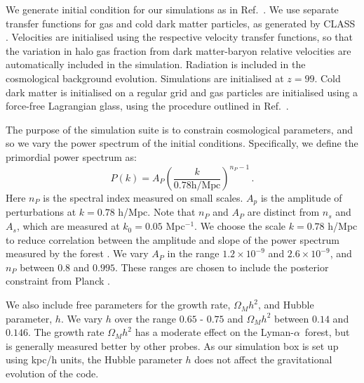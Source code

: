 \documentclass[a4paper,11pt]{article}
\newcommand{\Lya}{Lyman-$\alpha$}
\begin{document}
We generate initial condition for our simulations as in Ref.~\cite{Bird:2020}. We use separate transfer functions for gas and cold dark matter particles, as generated by CLASS \cite{CLASS}. Velocities are initialised using the respective velocity transfer functions, so that the variation in halo gas fraction from dark matter-baryon relative velocities are automatically included in the simulation. Radiation is included in the cosmological background evolution. Simulations are initialised at $z=99$. Cold dark matter is initialised on a regular grid and gas particles are initialised using a force-free Lagrangian glass, using the procedure outlined in Ref.~\cite{Bird:2020}.

The purpose of the simulation suite is to constrain cosmological parameters, and so we vary the power spectrum of the initial conditions. Specifically, we define the primordial power spectrum as:
\begin{equation}
 P(k) = A_P \left(\frac{k}{ 0.78 \mathrm{h/Mpc}}\right)^{n_P-1}\,.
 \label{eq:pk}
\end{equation}
Here $n_P$ is the spectral index measured on small scales. $A_p$ is the amplitude of perturbations at $k = 0.78$ h/Mpc. Note that $n_P$ and $A_P$ are distinct from $n_s$ and $A_s$, which are measured at $k_0 = 0.05$ Mpc$^{-1}$. We choose the scale $k = 0.78$ h/Mpc to reduce correlation between the amplitude and slope of the power spectrum measured by the forest \cite{Bird:2019}. We vary $A_P$ in the range $1.2 \times 10^{-9}$ and $2.6 \times 10^{-9}$, and $n_P$  between $0.8$ and $0.995$. These ranges are chosen to include the posterior constraint from Planck \cite{Planck:2018}.

We also include free parameters for the growth rate, $\Omega_M h^2$, and Hubble parameter, $h$. We vary $h$ over the range $0.65$ - $0.75$ and $\Omega_M h^2$ between $0.14$ and $0.146$. The growth rate $\Omega_M h^2$ has a moderate effect on the \Lya~forest, but is generally measured better by other probes. As our simulation box is set up using kpc/h units, the Hubble parameter $h$ does not affect the gravitational evolution of the code.
\end{document}
